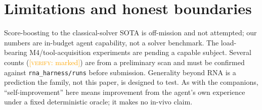 \documentclass[11pt]{article}
\newcommand{\verify}[1]{\textcolor{orange}{[\textsc{verify}: #1]}}
\begin{document}
\section{Limitations and honest boundaries}
Score-boosting to the classical-solver SOTA is off-mission and not attempted; our numbers are
in-budget agent capability, not a solver benchmark. The load-bearing M4/tool-acquisition experiments
are pending a capable subject. Several counts (\verify{marked}) are from a preliminary scan and must
be confirmed against \texttt{rna\_harness/runs} before submission. Generality beyond RNA is a
prediction the family, not this paper, is designed to test. As with the companions, ``self-improvement''
here means improvement from the agent's own experience under a fixed deterministic oracle; it makes no
in-vivo claim.

\small
\end{document}
